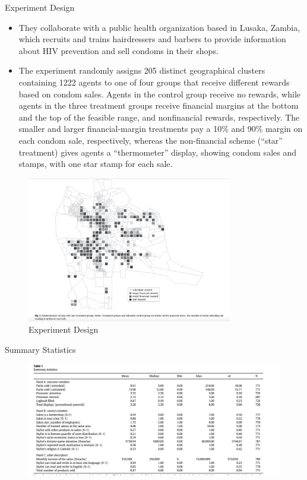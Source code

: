 \documentclass{beamer}
\begin{document}
\begin{frame}[allowframebreaks]{Experiment Design}
    \begin{itemize}
        \item They  collaborate with a public health organization
        based in Lusaka, Zambia, which recruits and trains hairdressers and
        barbers to provide information about HIV prevention and sell condoms
        in their shops.
        \item The experiment randomly assigns 205 distinct geographical clusters
        containing 1222 agents to one of four groups that receive different
        rewards based on condom sales. Agents in the control group receive no
        rewards, while agents in the three treatment groups receive financial
        margins at the bottom and the top of the feasible range, and nonfinancial rewards, respectively. The smaller and larger financial-margin
        treatments pay a 10\% and 90\% margin on each condom sale, respectively,
        whereas the non-financial scheme (“star” treatment) gives agents a
        “thermometer” display, showing condom sales and stamps, with one
        star stamp for each sale.        
    \end{itemize}
  
\begin{figure}
    \centering
    \includegraphics[width=0.8\textwidth]{F1.png}
    \caption{Experiment Design}
    \label{fig:my_label}
\end{figure}
\end{frame}

\begin{frame}{Summary Statistics}
    \begin{figure}
        \centering
        \includegraphics[width=\textwidth]{T1.png}
        \label{fig:my_label}
    \end{figure}




\end{frame}
\end{document}
